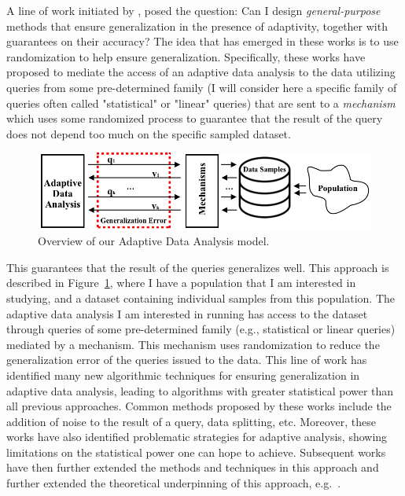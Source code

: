  A line of work initiated by \cite{DworkFHPRR15}, \cite{HardtU14} posed the question: 
 Can I design \emph{general-purpose} methods that ensure generalization in the presence of adaptivity, together with guarantees on their accuracy? 
 The idea that has emerged in these works is to use randomization to help ensure generalization. 
 Specifically, these works have proposed to mediate the access of an adaptive data analysis to the data utilizing queries from some pre-determined family (I will consider here a specific family of queries often called "statistical" or "linear" queries) that are sent to a 
 \emph{mechanism} which uses some randomized process to guarantee that the result of the query does not depend too much on the specific
 sampled dataset. 
 \begin{figure}
  \centering
  \includegraphics[width=0.7\columnwidth]{figures/data_analysis_model.png}
  \caption{Overview of our Adaptive Data Analysis model.}
  \label{fig:adaptivity-model-overview}
 \vspace{-0.5cm}
 \end{figure}
 This guarantees that the result of the queries generalizes well. 
 This approach is described in Figure~\ref{fig:adaptivity-model-overview}, where
 I have a population that I am interested in studying, and a dataset containing individual samples from this population. The adaptive data analysis I am interested in running has access to the dataset through queries of some pre-determined family (e.g., statistical or linear queries) mediated by a mechanism. 
 This mechanism uses randomization to reduce the generalization error of the queries issued to the data.
 This line of work has identified many new algorithmic techniques for ensuring generalization in adaptive data analysis, leading to algorithms with greater statistical power than all previous approaches. 
 Common methods proposed by these works include the addition of noise to the result of a query, data splitting, etc. 
 Moreover, these works have also identified problematic strategies for adaptive analysis, showing limitations on the statistical power one can hope to achieve. 
 Subsequent works have then further extended the methods and techniques in this approach and further extended the theoretical underpinning of this approach, 
 e.g.~\cite{dwork2015reusable,dwork2015generalization,BassilyNSSSU16,UllmanSNSS18,FeldmanS17,jung2019new,SteinkeZ20,RogersRSSTW20}.
 
